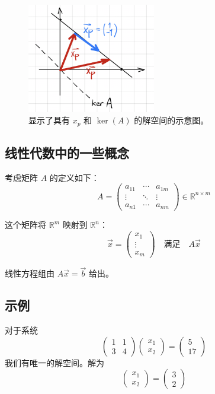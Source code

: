 \documentclass{ctexart}
\begin{document}
\begin{figure}[h!]
\centering
\includegraphics[width=0.5\textwidth]{solution_space.png}
\caption{显示了具有 \( x_p \) 和 \( \ker(A) \) 的解空间的示意图。}
\end{figure}

\subsection*{线性代数中的一些概念}

考虑矩阵 \( A \) 的定义如下：
\[ A = \begin{pmatrix}
    a_{11} & \cdots & a_{1m} \\
    \vdots & \ddots & \vdots \\
    a_{n1} & \cdots & a_{nm}
\end{pmatrix} \in \mathbb{R}^{n \times m} \]

这个矩阵将 \( \mathbb{R}^m \) 映射到 \( \mathbb{R}^n \)：
\[ \vec{x} = \begin{pmatrix}
    x_1 \\
    \vdots \\
    x_m
\end{pmatrix} \quad \text{满足} \quad A\vec{x} \]

线性方程组由 \( A\vec{x} = \vec{b} \) 给出。

\subsection*{示例}
对于系统
\[ \begin{pmatrix}
    1 & 1 \\
    3 & 4
\end{pmatrix} \begin{pmatrix}
    x_1 \\
    x_2
\end{pmatrix} = \begin{pmatrix}
    5 \\
    17
\end{pmatrix} \]
我们有唯一的解空间。解为
\[ \begin{pmatrix}
    x_1 \\
    x_2
\end{pmatrix} = \begin{pmatrix}
    3 \\
    2
\end{pmatrix} \]
\end{document}

